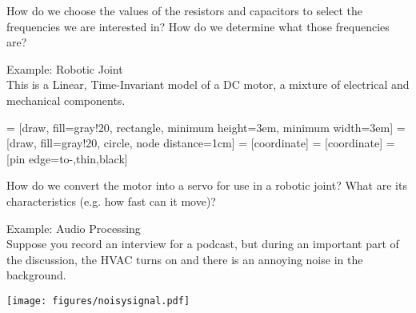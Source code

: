 How do we choose the values of the resistors and capacitors to select the frequencies we are interested in? How do we determine what those frequencies are?

Example: Robotic Joint\\

  This is a Linear, Time-Invariant model of a DC motor, a mixture of electrical and mechanical components.
  
 = [draw, fill=gray!20, rectangle, 
    minimum height=3em, minimum width=3em]
 = [draw, fill=gray!20, circle, node distance=1cm]
 = [coordinate]
 = [coordinate]
 = [pin edge={to-,thin,black}]


How do we convert the motor into a servo for use in a robotic joint? What are its characteristics (e.g. how fast can it move)?

Example: Audio Processing\\

  Suppose you record an interview for a podcast, but during an important part of the discussion, the HVAC turns on and there is an annoying noise in the background.

\begin{center}
\texttt{[image: figures/noisysignal.pdf]}
\end{center}


